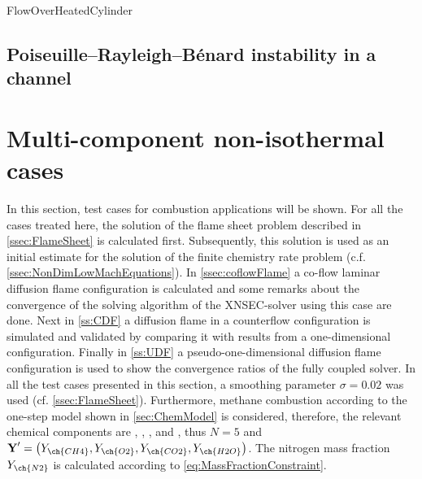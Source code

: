 FlowOverHeatedCylinder


\subsection{Poiseuille–Rayleigh–Bénard instability in a channel}







\section{Multi-component non-isothermal cases}\label{sec:MultCompNonIsothermCase}
In this section, test cases for combustion applications will be shown. For all the cases treated here, the solution of the flame sheet problem described in \cref{ssec:FlameSheet} is calculated first. Subsequently, this solution is used as an initial estimate for the solution of the finite chemistry rate problem (c.f. \cref{ssec:NonDimLowMachEquations}). In \cref{ssec:coflowFlame} a co-flow laminar diffusion flame configuration is calculated and some remarks about the convergence of the solving algorithm of the XNSEC-solver using this case are done. Next in \cref{ss:CDF} a diffusion flame in a counterflow configuration is simulated and validated by comparing it with results from a one-dimensional configuration. Finally in \cref{ss:UDF} a pseudo-one-dimensional diffusion flame configuration is used to show the convergence ratios of the fully coupled solver. In all the test cases presented in this section, a smoothing parameter $\sigma = 0.02$ was used (cf. \cref{ssec:FlameSheet}). Furthermore, methane combustion according to the one-step model shown in \cref{sec:ChemModel} is considered, therefore, the relevant chemical components are , , ,  and , thus $N = 5$ and $\vec{Y}' = \left(Y_{\ch{CH4}},Y_{\ch{O2}},Y_{\ch{CO2}},Y_{\ch{H2O}}\right)$. The nitrogen mass fraction $Y_{\ch{N2}}$ is calculated according to \cref{eq:MassFractionConstraint}.







\FloatBarrier
